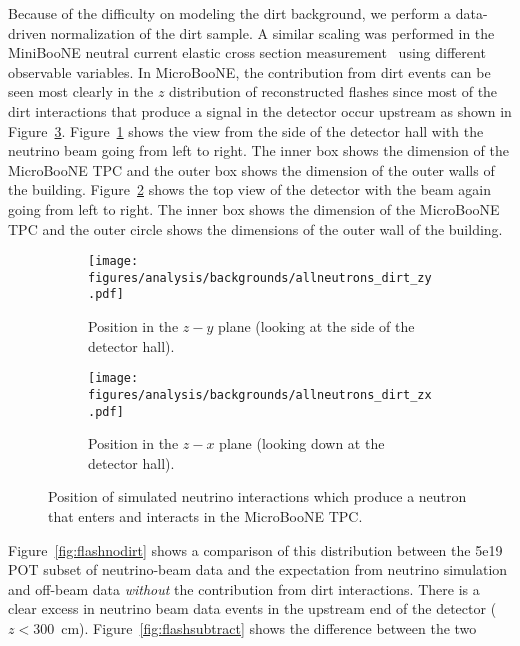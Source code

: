     Because of the difficulty on modeling the dirt background, we perform a
    data-driven normalization of the dirt sample. A similar scaling was
    performed in the MiniBooNE neutral current elastic cross section
    measurement~\cite{Aguilar-Arevalo:2010cx} using different observable
    variables. In MicroBooNE, the contribution from dirt events can be seen
    most clearly in the $z$ distribution of reconstructed flashes since most of
    the dirt interactions that produce a signal in the detector occur upstream
    as shown in Figure~\ref{fig:dirtneutronpos}. Figure~\ref{fig:dirtnzy} shows
    the view from the side of the detector hall with the neutrino beam going
    from left to right. The inner box shows the dimension of the MicroBooNE TPC
    and the outer box shows the dimension of the outer walls of the building.
    Figure~\ref{fig:dirtnzx} shows the top view of the detector with the beam
    again going from left to right. The inner box shows the dimension of the
    MicroBooNE TPC and the outer circle shows the dimensions of the outer wall
    of the building.
    \begin{figure}[h]
      \centering
      \begin{subfigure}[t]{2.8in}
        \texttt{[image: figures/analysis/backgrounds/allneutrons\_dirt\_zy.pdf]}
        \caption{Position in the $z-y$ plane (looking at the side of the detector hall).}
        \label{fig:dirtnzy}
      \end{subfigure}
      \hspace{2pt}
      \begin{subfigure}[t]{2.8in}
        \texttt{[image: figures/analysis/backgrounds/allneutrons\_dirt\_zx.pdf]}
        \caption{Position in the $z-x$ plane (looking down at the detector hall).}
        \label{fig:dirtnzx}
      \end{subfigure}
      \caption{Position of simulated neutrino interactions which produce a
      neutron that enters and interacts in the MicroBooNE TPC.}
      \label{fig:dirtneutronpos}
    \end{figure}
    Figure~\ref{fig:flashnodirt} shows a comparison of this distribution
    between the 5e19 POT subset of neutrino-beam data and the expectation from
    neutrino simulation and off-beam data \textit{without} the contribution
    from dirt interactions. There is a clear excess in neutrino beam data
    events in the upstream end of the detector ($z < 300$~cm).
    Figure~\ref{fig:flashsubtract} shows the difference between the two
